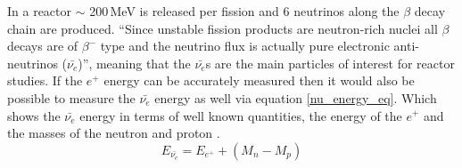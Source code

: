 In a reactor $\sim$ 200\,MeV is released per fission and 6 neutrinos along the $\beta$ decay chain are produced. ``Since unstable fission products are neutron-rich nuclei all $\beta$ decays are of $\beta^-$ type and the neutrino flux is actually pure electronic anti-neutrinos ($\bar{\nu_e}$)''\cite{Mueller_2011}, meaning that the $\bar{\nu_e}$s are the main particles of interest for reactor studies. If the $e^+$ energy can be accurately measured then it would also be possible to measure the $\bar{\nu_e}$ energy as well via equation \ref{nu_energy_eq}. Which shows the $\bar{\nu_e}$ energy in terms of well known quantities, the energy of the $e^+$ and the masses of the neutron and proton \cite{Vogel_1999}. 
\begin{equation}
 E_{\bar{\nu_e}} = E_{e^+} + (M_n - M_p) 
\label{nu_energy_eq}
\end{equation}

